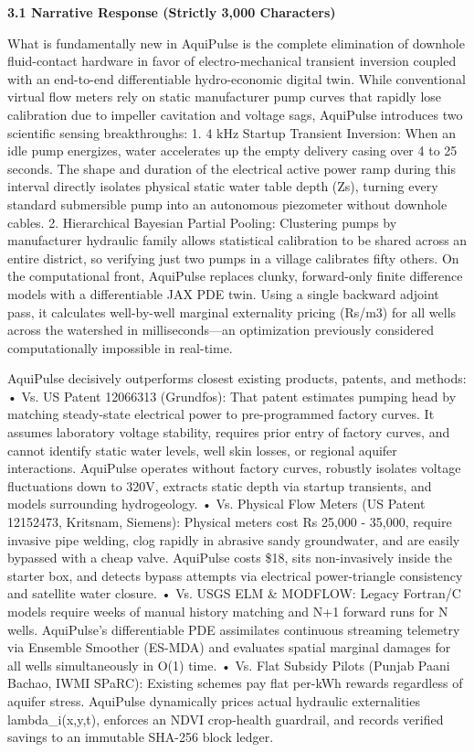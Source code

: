 \documentclass[10pt,a4paper]{article}
\begin{document}
{\small \textbf{\color{secondary}3.1 Narrative Response (Strictly 3,000 Characters)}}

What is fundamentally new in AquiPulse is the complete elimination of downhole fluid-contact hardware in favor of electro-mechanical transient inversion coupled with an end-to-end differentiable hydro-economic digital twin. While conventional virtual flow meters rely on static manufacturer pump curves that rapidly lose calibration due to impeller cavitation and voltage sags, AquiPulse introduces two scientific sensing breakthroughs:
1. 4 kHz Startup Transient Inversion: When an idle pump energizes, water accelerates up the empty delivery casing over 4 to 25 seconds. The shape and duration of the electrical active power ramp during this interval directly isolates physical static water table depth (Zs), turning every standard submersible pump into an autonomous piezometer without downhole cables.
2. Hierarchical Bayesian Partial Pooling: Clustering pumps by manufacturer hydraulic family allows statistical calibration to be shared across an entire district, so verifying just two pumps in a village calibrates fifty others. On the computational front, AquiPulse replaces clunky, forward-only finite difference models with a differentiable JAX PDE twin. Using a single backward adjoint pass, it calculates well-by-well marginal externality pricing (Rs/m3) for all wells across the watershed in milliseconds—an optimization previously considered computationally impossible in real-time.

AquiPulse decisively outperforms closest existing products, patents, and methods:
• Vs. US Patent 12066313 (Grundfos): That patent estimates pumping head by matching steady-state electrical power to pre-programmed factory curves. It assumes laboratory voltage stability, requires prior entry of factory curves, and cannot identify static water levels, well skin losses, or regional aquifer interactions. AquiPulse operates without factory curves, robustly isolates voltage fluctuations down to 320V, extracts static depth via startup transients, and models surrounding hydrogeology.
• Vs. Physical Flow Meters (US Patent 12152473, Kritsnam, Siemens): Physical meters cost Rs 25,000 - 35,000, require invasive pipe welding, clog rapidly in abrasive sandy groundwater, and are easily bypassed with a cheap valve. AquiPulse costs \$18, sits non-invasively inside the starter box, and detects bypass attempts via electrical power-triangle consistency and satellite water closure.
• Vs. USGS ELM \& MODFLOW: Legacy Fortran/C models require weeks of manual history matching and N+1 forward runs for N wells. AquiPulse's differentiable PDE assimilates continuous streaming telemetry via Ensemble Smoother (ES-MDA) and evaluates spatial marginal damages for all wells simultaneously in O(1) time.
• Vs. Flat Subsidy Pilots (Punjab Paani Bachao, IWMI SPaRC): Existing schemes pay flat per-kWh rewards regardless of aquifer stress. AquiPulse dynamically prices actual hydraulic externalities lambda_i(x,y,t), enforces an NDVI crop-health guardrail, and records verified savings to an immutable SHA-256 block ledger.
\end{document}
